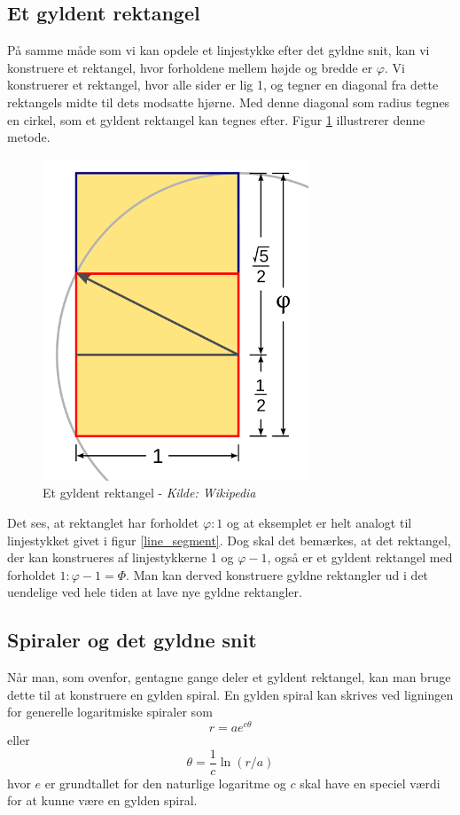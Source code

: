 {\subsection{Et gyldent rektangel}
På samme måde som vi kan opdele et linjestykke efter det gyldne snit,
kan vi konstruere et rektangel, hvor forholdene mellem højde og bredde er
$\varphi$. Vi konstruerer et rektangel, hvor alle sider er lig 1, og
tegner en diagonal fra dette rektangels midte til dets modsatte hjørne. Med
denne diagonal som radius tegnes en cirkel, som et gyldent rektangel kan
tegnes efter. Figur \ref{golden_rectangle} illustrerer denne metode.

\begin{figure}[h!]
	\begin{center}
		\includegraphics[scale=0.35,angle=0]{afsnit/baggrund/billeder/Golden_Rectangle_Construction}
	\end{center}
	\caption[Et gyldent rektangel]{Et gyldent rektangel - \emph{Kilde: Wikipedia}}
	\label{golden_rectangle}
\end{figure}
Det ses, at rektanglet har forholdet $\varphi:1$ og at eksemplet er helt
analogt til linjestykket givet i figur \ref{line_segment}. Dog skal
det bemærkes, at det rektangel, der kan konstrueres af linjestykkerne 1
og $\varphi - 1$, også er et gyldent rektangel med forholdet $1:\varphi
-1 = \varPhi$. Man kan derved konstruere gyldne rektangler ud i det
uendelige ved hele tiden at lave nye gyldne rektangler.

\subsection{Spiraler og det gyldne snit}
Når man, som ovenfor, gentagne gange deler et gyldent rektangel, kan man
bruge dette til at konstruere en gylden spiral. En gylden spiral kan
skrives ved ligningen for generelle logaritmiske spiraler som
\begin{equation}
	r = ae^{c\theta}
	\label{log_spiral_2}
\end{equation}
eller
\begin{equation}
	\theta = \frac{1}{c}\ln(r/a)
	\label{log_spiral_1}
\end{equation}
hvor $e$ er grundtallet for den naturlige logaritme og $c$ skal have en
speciel værdi for at kunne være en gylden spiral.

}
